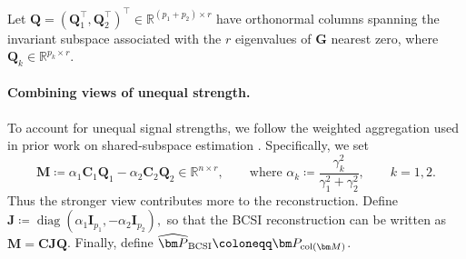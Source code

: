 \documentclass[11pt]{article}
\newcommand{\trans}{\top}
\DeclareMathOperator{\diag}{diag}
\begin{document}
Let
$\bm Q=(\bm Q_1^\trans,\bm Q_2^\trans)^\trans
\in\mathbb R^{(p_1+p_2)\times r}$
have orthonormal columns spanning the invariant subspace associated with the
$r$ eigenvalues of $\bm G$ nearest zero, where
$\bm Q_k\in\mathbb R^{p_k\times r}$.

\paragraph{Combining views of unequal strength.}
To account for unequal signal strengths, we follow the weighted aggregation
used in prior work on shared-subspace estimation
\citep{baharav2025stacked,li2025heterojive}.
Specifically, we set
\begin{equation}
\label{eq:M}
  \bm M
  \coloneqq
  \alpha_1\bm C_1\bm Q_1
  -
  \alpha_2\bm C_2\bm Q_2
  \in\mathbb R^{n\times r}, 
  \qquad \text{where }   \alpha_k
  \coloneqq
  \frac{\gamma_k^2}{\gamma_1^2+\gamma_2^2},
  \qquad k=1,2.
\end{equation}
Thus the stronger view contributes more to the reconstruction.
Define $ \bm J \coloneqq \diag(\alpha_1\bm I_{p_1},-\alpha_2\bm I_{p_2}), $ so that the BCSI reconstruction can be written as $\bm M=\bm C\bm J\bm Q$. 
Finally, define
$\widehat{\bm P}_{\rm BCSI}
\coloneqq
\bm P_{\operatorname{col}(\bm M)}$.
\end{document}
